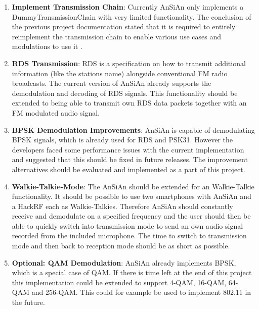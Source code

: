 	\begin{enumerate}
		\item \textbf{Implement Transmission Chain}: Currently \ac{AnSiAn} only implements a DummyTransmissionChain with very limited functionality. The conclusion of the previous project documentation stated that it is required to entirely reimplement the transmission chain to enable various use cases and modulations to use it \cite{Mantz2016}. 
		
		\item \textbf{\ac{RDS} Transmission}: \ac{RDS} is a specification on how to transmit additional information (like the stations name) alongside conventional FM radio broadcasts. The current version of \ac{AnSiAn} already supports the demodulation and decoding of RDS signals. This functionality should be extended to being able to transmit own RDS data packets together with an FM modulated audio signal. 
		
		\item \textbf{\ac{BPSK} Demodulation Improvements}: \ac{AnSiAn} is capable of demodulating \ac{BPSK} signals, which is already used for \ac{RDS} and PSK31. However the developers faced some performance issues with the current implementation and suggested that this should be fixed in future releases. The improvement alternatives should be evaluated and implemented as a part of this project.
		
		\item \textbf{Walkie-Talkie-Mode}: The \ac{AnSiAn} should be extended for an Walkie-Talkie functionality. It should be possible to use two smartphones with \ac{AnSiAn} and a HackRF each as Walkie-Talkies. Therefore \ac{AnSiAn} should constantly receive and demodulate on a specified frequency and the user should then be able to quickly switch into transmission mode to send an own audio signal recorded from the included microphone. The time to switch to transmission mode and then back to reception mode should be as short as possible. 
		
		\item \textbf{Optional: \ac{QAM} Demodulation}: \ac{AnSiAn} already implements BPSK, which is a special case of \ac{QAM}. If there is time left at the end of this project this implementation could be extended to support 4-\ac{QAM}, 16-\ac{QAM}, 64-\ac{QAM} and 256-\ac{QAM}. This could for example be used to implement 802.11 in the future. 
	\end{enumerate}
	

